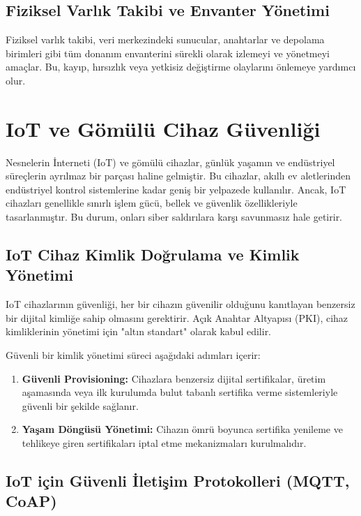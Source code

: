 \subsection{Fiziksel Varlık Takibi ve Envanter Yönetimi}

Fiziksel varlık takibi, veri merkezindeki sunucular, anahtarlar ve depolama birimleri gibi tüm donanım envanterini sürekli olarak izlemeyi ve yönetmeyi amaçlar. Bu, kayıp, hırsızlık veya yetkisiz değiştirme olaylarını önlemeye yardımcı olur.

\section{IoT ve Gömülü Cihaz Güvenliği}
Nesnelerin İnterneti (IoT) ve gömülü cihazlar, günlük yaşamın ve endüstriyel süreçlerin ayrılmaz bir parçası haline gelmiştir. Bu cihazlar, akıllı ev aletlerinden endüstriyel kontrol sistemlerine kadar geniş bir yelpazede kullanılır. Ancak, IoT cihazları genellikle sınırlı işlem gücü, bellek ve güvenlik özellikleriyle tasarlanmıştır. Bu durum, onları siber saldırılara karşı savunmasız hale getirir.

\subsection{IoT Cihaz Kimlik Doğrulama ve Kimlik Yönetimi}

IoT cihazlarının güvenliği, her bir cihazın güvenilir olduğunu kanıtlayan benzersiz bir dijital kimliğe sahip olmasını gerektirir. Açık Anahtar Altyapısı (PKI), cihaz kimliklerinin yönetimi için "altın standart" olarak kabul edilir.

Güvenli bir kimlik yönetimi süreci aşağıdaki adımları içerir:
\begin{enumerate}
    \item \textbf{Güvenli Provisioning:} Cihazlara benzersiz dijital sertifikalar, üretim aşamasında veya ilk kurulumda bulut tabanlı sertifika verme sistemleriyle güvenli bir şekilde sağlanır.
    \item \textbf{Yaşam Döngüsü Yönetimi:} Cihazın ömrü boyunca sertifika yenileme ve tehlikeye giren sertifikaları iptal etme mekanizmaları kurulmalıdır.
\end{enumerate}

\subsection{IoT için Güvenli İletişim Protokolleri (MQTT, CoAP)}


